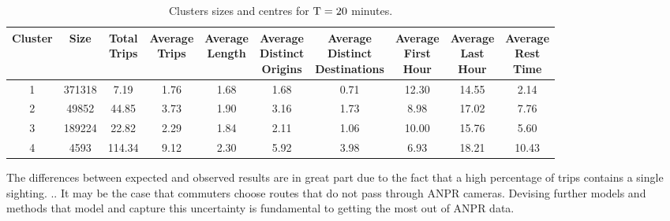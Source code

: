 \begin{table*}[t]
\centering
\small
\begin{tabular}{c c c c c c c c c c}
  \hline
 Cluster &  Size & \thead{Total\\Trips} & \thead{Average\\Trips} & \thead{Average\\Length} & \thead{Average\\Distinct\\Origins} & \thead{Average\\Distinct\\Destinations} & \thead{Average\\First\\Hour} & \thead{Average\\Last\\Hour} & \thead{Average\\Rest\\Time} \\
  \hline
  1 & 371318 & 7.19 & 1.76 & 1.68 & 1.68 & 0.71 & 12.30 & 14.55 & 2.14 \\
    2 & 49852 & 44.85 & 3.73 & 1.90 & 3.16 & 1.73 & 8.98 & 17.02 & 7.76 \\
    3 & 189224 & 22.82 & 2.29 & 1.84 & 2.11 & 1.06 & 10.00 & 15.76 & 5.60 \\
    4 & 4593 & 114.34 & 9.12 & 2.30 & 5.92 & 3.98 & 6.93 & 18.21 & 10.43 \\
   \hline
\end{tabular}
\caption{Clusters sizes and centres for $\mathrm{T} = 20$ minutes.}
\label{t:kmeans_centers_1200}
\end{table*}

The differences between expected and observed results are in great part due to the fact that a high percentage of trips contains a single sighting. .. It may be the case that commuters choose routes that do not pass through ANPR cameras. Devising further models and methods that model and capture this uncertainty is fundamental to getting the most out of ANPR data.

